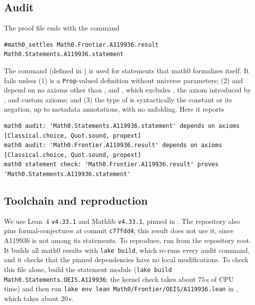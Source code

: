 \documentclass[11pt]{amsart}
\theoremstyle{plain}
\theoremstyle{definition}
\begin{document}
\subsection*{Audit}
The proof file ends with the command
\begin{lstlisting}
#math0_settles Math0.Frontier.A119936.result Math0.Statements.A119936.statement
\end{lstlisting}
The command  (defined in ) is used for statements that math0 formalizes itself. It fails unless (1)  is a \texttt{Prop}-valued definition without universe parameters; (2)  and  depend on no axioms other than ,  and , which excludes , the axiom  introduced by , and custom axioms; and (3) the type of  is syntactically the constant  or its negation, up to metadata annotations, with no unfolding. Here it reports
\begin{lstlisting}[basicstyle=\ttfamily\scriptsize]
math0 audit: 'Math0.Statements.A119936.statement' depends on axioms [Classical.choice, Quot.sound, propext]
math0 audit: 'Math0.Frontier.A119936.result' depends on axioms [Classical.choice, Quot.sound, propext]
math0 statement check: 'Math0.Frontier.A119936.result' proves 'Math0.Statements.A119936.statement'
\end{lstlisting}

\subsection*{Toolchain and reproduction}
We use Lean~4 \cite{Lean4} \texttt{v4.33.1} and Mathlib \cite{Mathlib} \texttt{v4.33.1}, pinned in . The repository also pins formal-conjectures \cite{FC} at commit \texttt{c77fdd4}; this result does not use it, since A119936 is not among its statements. To reproduce, run  from the repository root. It builds all math0 results with \texttt{lake build}, which re-runs every audit command, and it checks that the pinned dependencies have no local modifications. To check this file alone, build the statement module (\texttt{lake build Math0.Statements.OEIS.A119936}; the kernel check  takes about $75$\,s of CPU time) and then run \texttt{lake env lean Math0/Frontier/OEIS/A119936.lean} in , which takes about $20$\,s.
\end{document}
